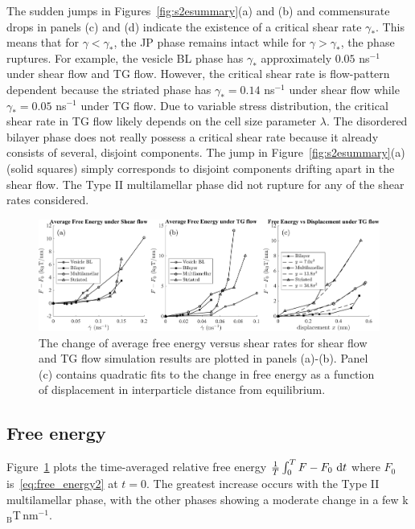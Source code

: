 \documentclass[prb,preprint,showpacs,preprintnumbers,amsmath,amssymb,longbibliography]{revtex4-2}
\newcommand{\KBT}{k$_{\text{B}}$T}
\begin{document}
The sudden jumps in Figures~\ref{fig:s2esummary}(a) and (b) and
commensurate drops in panels (c) and (d) indicate the existence of a
critical shear rate $\gamma_*$. This means that for $\gamma < \gamma_*$,
the JP phase remains intact while for $\gamma > \gamma_*$, the phase
ruptures. For example, the vesicle BL phase has $\gamma_*$ approximately
$0.05$ ns$^{-1}$ under shear flow and TG flow. However, the critical
shear rate is flow-pattern dependent because the striated phase has
$\gamma_* = 0.14$ ns$^{-1}$ under shear flow while $\gamma_* = 0.05$
ns$^{-1}$ under TG flow. Due to variable stress distribution, the
critical shear rate in TG flow likely depends on the cell size parameter
$\lambda$. The disordered bilayer phase does not really possess a
critical shear rate because it already consists of several, disjoint
components. The jump in Figure~\ref{fig:s2esummary}(a) (solid squares)
simply corresponds to disjoint components drifting apart in the shear
flow. The Type II multilamellar phase did not rupture for any of the
shear rates considered.

\begin{figure}[t]
\begin{center}
\includegraphics[width=\textwidth]{FSummary.pdf}
\end{center}
\caption{\label{fig:fsummary}
  The change of average free energy versus shear rates for shear flow
  and TG flow simulation results are plotted in panels (a)-(b). Panel
  (c) contains quadratic fits to the change in free energy as a function
  of displacement in interparticle distance from equilibrium.}
\end{figure}

\subsection{Free energy}
\label{sec:free-energy}
Figure~\ref{fig:fsummary} plots the time-averaged relative free energy
$\frac{1}{T}\int_0^T F - F_0 \,\dif t$ where $F_0$
is~\eqref{eq:free_energy2} at $t = 0$. The greatest increase occurs with
the Type II multilamellar phase, with the other phases showing a
moderate change in a few \KBT\,nm$^{-1}$.
\end{document}
